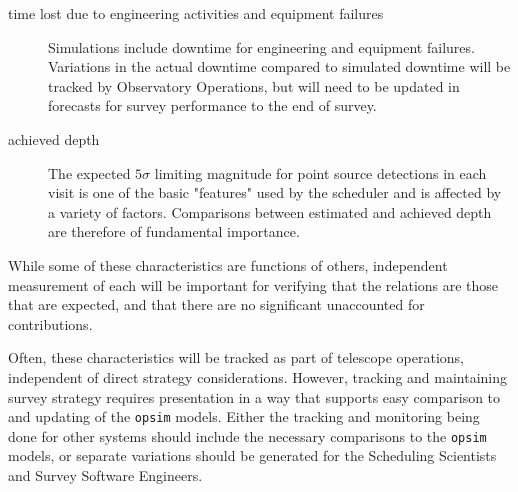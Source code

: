 \begin{description}
\item[{time lost due to engineering activities and equipment failures}] Simulations include downtime for engineering and equipment failures. Variations in the actual downtime compared to simulated downtime will be tracked by Observatory Operations, but will need to be updated in forecasts for survey performance to the end of survey. 
\item[{achieved depth}] The expected \(5 \sigma\) limiting magnitude for point source detections in each visit is one of the basic "features" used by the scheduler and is affected by a variety of factors. Comparisons between estimated and achieved depth are therefore of fundamental importance.
\end{description}

While some of these characteristics are functions of others, independent measurement of each will be important for verifying that the relations are those that are expected, and that there are no significant unaccounted for contributions.

Often, these characteristics will be tracked as part of telescope operations, independent of direct strategy considerations.
However, tracking and maintaining survey strategy requires presentation in a way that supports easy comparison to and updating of the \texttt{opsim} models.
Either the tracking and monitoring being done for other systems should include the necessary comparisons to the \texttt{opsim} models, or separate variations should be generated for the Scheduling Scientists and Survey Software Engineers.

